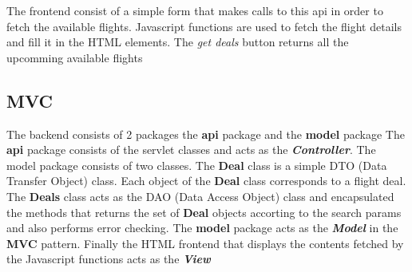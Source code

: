\documentclass[titlepage]{article}
\begin{document}
    The frontend consist of a simple form that makes calls to this api in order to fetch the
    available flights. Javascript functions are used to fetch the flight details and fill it
    in the HTML elements.
    The \emph{get deals} button returns all the upcomming available flights

    \subsection{MVC}
    The backend consists of 2 packages the \textbf{api} package and the \textbf{model} package
    The \textbf{api} package consists of the servlet classes and acts as the \textit{\textbf{Controller}}.
    The model package consists of two classes. The \textbf{Deal} class is a simple DTO (Data Transfer Object) class.
    Each object of the \textbf{Deal} class corresponds to a flight deal. 
    The \textbf{Deals} class acts as the DAO (Data Access Object) class and encapsulated the methods
    that returns the set of \textbf{Deal} objects accorting to the search params and also performs error checking.
    The \textbf{model} package acts as the \textit{\textbf{Model}} in the \textbf{MVC} pattern.
    Finally the HTML frontend that displays the contents fetched by the Javascript functions acts as the \textit{\textbf{View}}
\end{document}
